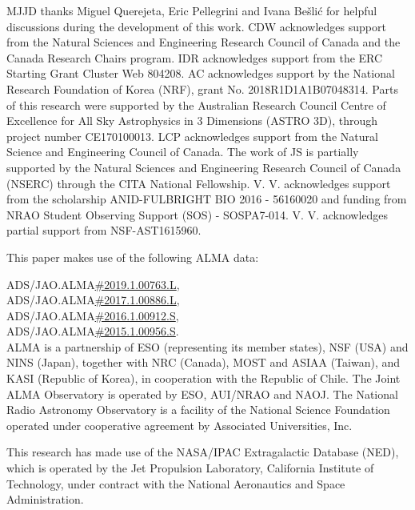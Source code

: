\documentclass[longauth]{aa}
\begin{document}
\begin{acknowledgements}
    MJJD thanks Miguel Querejeta, Eric Pellegrini and Ivana Be\v{s}li\'c for helpful discussions during the development of this work. CDW acknowledges support from the Natural Sciences and Engineering Research Council of Canada and the Canada Research Chairs program. IDR acknowledges support from the ERC Starting Grant Cluster Web 804208. AC acknowledges support by the National Research Foundation of Korea (NRF), grant No. 2018R1D1A1B07048314. Parts of this research were supported by the Australian Research Council Centre of Excellence for All Sky Astrophysics in 3 Dimensions (ASTRO 3D), through project number CE170100013. LCP acknowledges support from the Natural Science and Engineering Council of Canada. The work of JS is partially supported by the Natural Sciences and Engineering Research Council of Canada (NSERC) through the CITA National Fellowship. V. V. acknowledges support from the scholarship ANID-FULBRIGHT BIO 2016 - 56160020 and funding from NRAO Student Observing Support (SOS) - SOSPA7-014. V. V. acknowledges partial support from NSF-AST1615960. 
    
    This paper makes use of the following ALMA data: 
    
    ADS/JAO.ALMA\href{https://almascience.nrao.edu/asax/?result_view=observation&projectCode=\%222019.1.00763.L\%22}{\#2019.1.00763.L},\\ ADS/JAO.ALMA\href{https://almascience.nrao.edu/asax/?result_view=observation&projectCode=\%222017.1.00886.L\%22}{\#2017.1.00886.L},\\ ADS/JAO.ALMA\href{https://almascience.nrao.edu/asax/?result_view=observation&projectCode=\%222016.1.00912.S\%22}{\#2016.1.00912.S},\\ ADS/JAO.ALMA\href{https://almascience.nrao.edu/asax/?result_view=observation&projectCode=\%222015.1.00956.S\%22}{\#2015.1.00956.S}. \\
    
ALMA is a partnership of ESO (representing its member states), NSF (USA) and NINS (Japan), together with NRC (Canada), MOST and ASIAA (Taiwan), and KASI (Republic of Korea), in cooperation with the Republic of Chile. The Joint ALMA Observatory is operated by ESO, AUI/NRAO and NAOJ. The National Radio Astronomy Observatory is a facility of the National Science Foundation operated under cooperative agreement by Associated Universities, Inc.
      
This research has made use of the NASA/IPAC Extragalactic Database (NED), which is operated by the Jet Propulsion Laboratory, California Institute of Technology, under contract with the National Aeronautics and Space Administration.

\end{acknowledgements}
\end{document}
